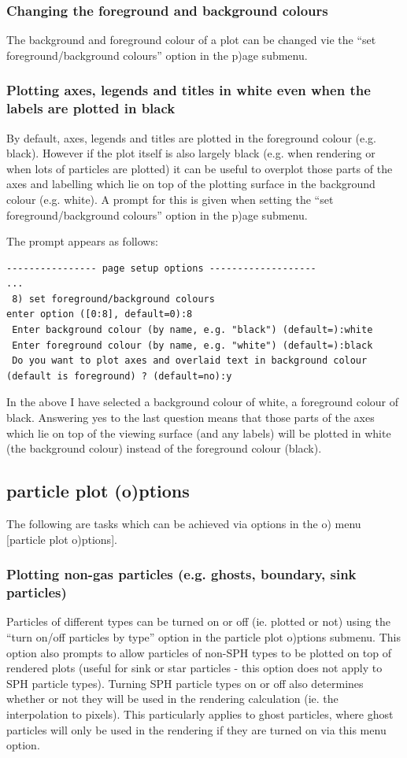 \documentclass[a4paper,11pt]{article}
\begin{document}
\subsubsection{ Changing the foreground and background colours}
\label{sec:pagecolours}
 The background and foreground colour of a plot can be changed vie the ``set foreground/background colours'' option in the p)age submenu.

\subsubsection{ Plotting axes, legends and titles in white even when the labels are plotted in black}
 By default, axes, legends and titles are plotted in the foreground colour (e.g. black). However if the plot itself is also largely black (e.g. when rendering or when lots of particles are plotted) it can be useful to overplot those parts of the axes and labelling which lie on top of the plotting surface in the background colour (e.g. white). A prompt for this is given when setting the ``set foreground/background colours'' option in the p)age submenu. 
 
 The prompt appears as follows:
\begin{verbatim}
---------------- page setup options -------------------
...
 8) set foreground/background colours 
enter option ([0:8], default=0):8
 Enter background colour (by name, e.g. "black") (default=):white
 Enter foreground colour (by name, e.g. "white") (default=):black
 Do you want to plot axes and overlaid text in background colour (default is foreground) ? (default=no):y
\end{verbatim}
 In the above I have selected a background colour of white, a foreground colour of black. Answering yes to the last question means that those parts of the axes which lie on top of the viewing surface (and any labels) will be plotted in white (the background colour) instead of the foreground colour (black). 

\subsection{particle plot (o)ptions}
\label{sec:opts}
 The following are tasks which can be achieved via options in the o) menu [particle plot o)ptions].
 
\subsubsection{ Plotting non-gas particles (e.g. ghosts, boundary, sink particles)}
\label{sec:plotparticlesbytype}
 Particles of different types can be turned on or off (ie. plotted or not) using the ``turn on/off particles by type'' option in the particle plot o)ptions submenu. This option also prompts to allow particles of non-SPH types to be
plotted on top of rendered plots (useful for sink or star particles - this option does not apply to SPH particle types).  Turning SPH particle types on or off also determines whether or not they will be used in the rendering calculation (ie. the interpolation to pixels). This particularly applies to ghost particles, where ghost particles will only be used in the rendering if they are turned on via this menu option.
\end{document}
